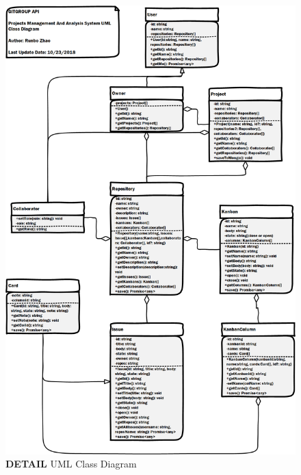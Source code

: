 \documentclass[12pt,a4paper]{report}
\begin{document}
\begin{figure}[h]
	\centering
	\includegraphics[height=0.95\textheight]{./pics/ClassDiagram.png}
	\caption{\textbf{DETAIL} UML Class Diagram}
\end{figure}


\cleardoublepage
\listoffigures
\cleardoublepage
\listoftables



\end{document}

